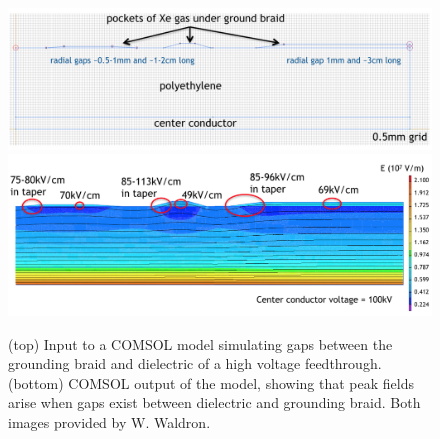 \begin{figure}[htbp]
\begin{center}
\includegraphics[width=\textwidth]{figures/testbed/will_comsol_1.png}\\
\includegraphics[width=\textwidth]{figures/testbed/will_comsol_2.png}
\caption{(top) Input to a COMSOL model simulating gaps between the grounding braid and dielectric of a high voltage feedthrough. (bottom) COMSOL output of the model, showing that peak fields arise when gaps exist between dielectric and grounding braid. Both images provided by W. Waldron.}
\label{fig:will_comsol}
\end{center}
\end{figure}

